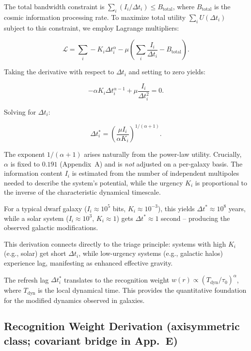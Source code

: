 \documentclass[12pt,a4paper]{article}
\begin{document}
The total bandwidth constraint is $\sum_i (I_i / \Delta t_i) \leq B_\mathrm{total}$, where $B_\mathrm{total}$ is the cosmic information processing rate. To maximize total utility $\sum_i U(\Delta t_i)$ subject to this constraint, we employ Lagrange multipliers:

\begin{equation}
\mathcal{L} = \sum_i -K_i \Delta t_i^\alpha - \mu \left( \sum_i \frac{I_i}{\Delta t_i} - B_\mathrm{total} \right).
\end{equation}

Taking the derivative with respect to $\Delta t_i$ and setting to zero yields:

\begin{equation}
-\alpha K_i \Delta t_i^{\alpha-1} + \mu \frac{I_i}{\Delta t_i^2} = 0.
\end{equation}

Solving for $\Delta t_i$:

\begin{equation}
\Delta t_i^* = \left( \frac{\mu I_i}{\alpha K_i} \right)^{1/(\alpha+1)}.
\end{equation}

The exponent $1/(\alpha+1)$ arises naturally from the power-law utility. Crucially, $\alpha$ is fixed to $0.191$ (Appendix~A) and is \emph{not} adjusted on a per-galaxy basis. The information content $I_i$ is estimated from the number of independent multipoles needed to describe the system's potential, while the urgency $K_i$ is proportional to the inverse of the characteristic dynamical timescale.

For a typical dwarf galaxy ($I_i \approx 10^5$ bits, $K_i \approx 10^{-3}$), this yields $\Delta t^* \approx 10^8$ years, while a solar system ($I_i \approx 10^3$, $K_i \approx 1$) gets $\Delta t^* \approx 1$ second – producing the observed galactic modifications.

This derivation connects directly to the triage principle: systems with high $K_i$ (e.g., solar) get short $\Delta t_i$, while low-urgency systems (e.g., galactic halos) experience lag, manifesting as enhanced effective gravity.

The refresh lag $\Delta t_i^*$ translates to the recognition weight $w(r) \propto (T_\mathrm{dyn}/\tau_0)^\alpha$, where $T_\mathrm{dyn}$ is the local dynamical time. This provides the quantitative foundation for the modified dynamics observed in galaxies.

\subsection{Recognition Weight Derivation (axisymmetric class; covariant bridge in App.~E)}
\end{document}
